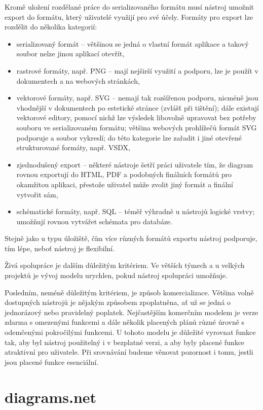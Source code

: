 Kromě uložení rozdělané práce do serializovaného formátu musí nástroj umožnit
export do formátu, který uživatelé využijí pro své účely. Formáty pro export lze
rozdělit do několika kategorií:
\begin{itemize}
  \item serializovaný formát -- většinou se jedná o vlastní formát aplikace a
  takový soubor nelze jinou aplikací otevřít,
  \item rastrové formáty, např. PNG -- mají nejširší využití a podporu, lze je
  použít v dokumentech a na webových stránkách,
  \item vektorové formáty, např. SVG -- nemají tak rozšířenou podporu, nicméně
  jsou vhodnější v dokumentech po estetické stránce (zvlášť při tištění); dále
  existují vektorové editory, pomocí nichž lze výsledek libovolně upravovat bez
  potřeby souboru ve serializovaném formátu; většina webových prohlížečů formát
  SVG podporuje a soubor vykreslí; do této kategorie lze zařadit i jiné otevřené
  strukturované formáty, např. VSDX,
  \item zjednodušený export -- některé nástroje šetří práci uživatele tím, že
  diagram rovnou exportují do HTML, PDF a podobných finálních formátů pro
  okamžitou aplikaci, přestože uživatel může zvolit jiný formát a finální
  vytvořit sám,
  \item schématické formáty, např. SQL -- téměř výhradně u nástrojů logické
  vrstvy; umožňují rovnou vytvářet schémata pro databáze.
\end{itemize}

Stejně jako u typu úložiště, čím více různých formátů exportu nástroj podporuje,
tím lépe, neboť nástroj je flexibilní.

Živá spolupráce je dalším důležitým kritériem. Ve větších týmech a u velkých
projektů je vývoj modelu urychlen, pokud nástroj spolupráci umožňuje.

Posledním, neméně důležitým kritériem, je způsob komercializace. Většina volně
dostupných nástrojů je nějakým způsobem zpoplatněna, ať už se jedná o
jednorázový nebo pravidelný poplatek. Nejčastějším komerčním modelem je verze
zdarma s omezenými funkcemi a dále několik placených plánů různé úrovně s
odemčenými pokročilými funkcemi. U tohoto modelu je důležité vyrovnat funkce
tak, aby byl nástroj použitelný i v bezplatné verzi, a aby byly placené funkce
atraktivní pro uživatele. Při srovnávání budeme věnovat pozornost i tomu, jestli
jsou placené funkce esenciální.

\section{diagrams.net}

